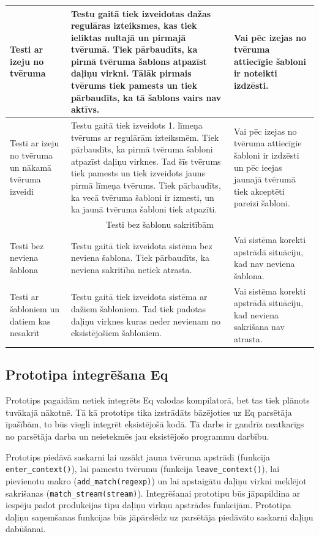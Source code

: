 \begin{longtable}{|p{90pt}|p{210pt}|p{120pt}|}
Testi ar izeju no tvēruma & Testu gaitā tiek izveidotas dažas regulāras izteiksmes, kas tiek ieliktas nultajā un pirmajā tvērumā. Tiek pārbaudīts, ka pirmā tvēruma šablons atpazīst daļiņu virkni. Tālāk pirmais tvērums tiek pamests un tiek pārbaudīts, ka tā šablons vairs nav aktīvs. & Vai pēc izejas no tvēruma attiecīgie šabloni ir noteikti izdzēsti. \\ \hline
Testi ar izeju no tvēruma un nākamā tvēruma izveidi & Testu gaitā tiek izveidots 1. līmeņa tvērums ar regulārām izteiksmēm. Tiek pārbaudīts, ka pirmā tvēruma šabloni atpazīst daļiņu virknes. Tad šīs tvērums tiek pamests un tiek izveidots jauns pirmā līmeņa tvērums. Tiek pārbaudīts, ka vecā tvēruma šabloni ir izmesti, un ka jaunā tvēruma šabloni tiek atpazīti. & Vai pēc izejas no tvēruma attiecīgie šabloni ir izdzēsti un pēc ieejas jaunajā tvērumā tiek akceptēti pareizi šabloni. \\ \hline
\multicolumn{ 3}{|c|}{Testi bez šablonu sakritībām} \\ \hline
Testi bez neviena šablona & Testu gaitā tiek izveidota sistēma bez neviena šablona. Tiek pārbaudīts, ka neviena sakritība netiek atrasta. & Vai sistēma korekti apstrādā situāciju, kad nav neviena šablona. \\ \hline
Testi ar šabloniem un datiem kas nesakrīt & Testu gaitā tiek izveidota sistēma ar dažiem šabloniem. Tad tiek padotas daļiņu virknes kuras neder nevienam no eksistējošiem šabloniem. & Vai sistēma korekti apstrādā situāciju, kad neviena sakrišana nav atrasta. \\ \hline
\end{longtable}

\subsection{\label{sbs:res_tintegration}Prototipa integrēšana Eq}

Prototips pagaidām netiek integrēts Eq valodas kompilatorā, bet tas tiek plānots tuvākajā nākotnē. Tā kā prototips tika izstrādāts bāzējoties uz Eq parsētāja īpašībām, to būs viegli integrēt eksistējošā kodā. Tā darbs ir gandrīz neatkarīgs no parsētāja darba un neietekmēs jau eksistējošo programmu darbību.

Prototips piedāvā saskarni lai uzsākt jauna tvēruma apstrādi (funkcija \verb|enter_context()|), lai pamestu tvērumu (funkcija \verb|leave_context()|), lai pievienotu makro (\verb|add_match(regexp)|) un lai apstaigātu daļiņu virkni meklējot sakrišanas (\verb|match_stream(stream)|). Integrēšanai prototipu būs jāpapildina ar iespēju padot produkcijas tipu daļiņu virkņu apstrādes funkcijām. Prototipa daļiņu saņemšanas funkcijas būs jāpārslēdz uz parsētāja piedāvāto saskarni daļiņu dabūšanai.

